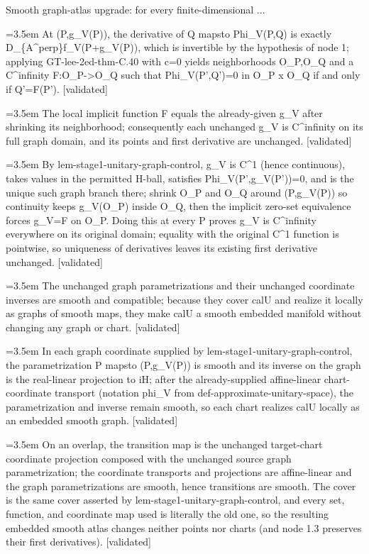 \documentclass{article}
\newcommand{\step}[1]{\par\noindent\hangindent=3.5em\hangafter=1%
  \makebox[3.5em][l]{\textbf{#1.}}}
\newcommand{\steptag}[1]{\hfill{\small\textsf{[#1]}}}
\begin{document}
\begin{proofbox}{Smooth graph-atlas upgrade: for every finite-dimensional ...}
\step{1.2.2} At (P,g\_V(P)), the derivative of Q mapsto Phi\_V(P,Q) is exactly D\_\{A\textasciicircum{}perp\}f\_V(P+g\_V(P)), which is invertible by the hypothesis of node 1; applying GT-lee-2ed-thm-C.40 with c=0 yields neighborhoods O\_P,O\_Q and a C\textasciicircum{}infinity F:O\_P->O\_Q such that Phi\_V(P',Q')=0 in O\_P x O\_Q if and only if Q'=F(P'). \steptag{validated} \\[4pt]
\step{1.3} The local implicit function F equals the already-given g\_V after shrinking its neighborhood; consequently each unchanged g\_V is C\textasciicircum{}infinity on its full graph domain, and its points and first derivative are unchanged. \steptag{validated} \\[6pt]
\step{1.3.1} By lem-stage1-unitary-graph-control, g\_V is C\textasciicircum{}1 (hence continuous), takes values in the permitted H-ball, satisfies Phi\_V(P',g\_V(P'))=0, and is the unique such graph branch there; shrink O\_P and O\_Q around (P,g\_V(P)) so continuity keeps g\_V(O\_P) inside O\_Q, then the implicit zero-set equivalence forces g\_V=F on O\_P. Doing this at every P proves g\_V is C\textasciicircum{}infinity everywhere on its original domain; equality with the original C\textasciicircum{}1 function is pointwise, so uniqueness of derivatives leaves its existing first derivative unchanged. \steptag{validated} \\[4pt]
\step{1.4} The unchanged graph parametrizations and their unchanged coordinate inverses are smooth and compatible; because they cover calU and realize it locally as graphs of smooth maps, they make calU a smooth embedded manifold without changing any graph or chart. \steptag{validated} \\[6pt]
\step{1.4.1} In each graph coordinate supplied by lem-stage1-unitary-graph-control, the parametrization P mapsto (P,g\_V(P)) is smooth and its inverse on the graph is the real-linear projection to iH; after the already-supplied affine-linear chart-coordinate transport (notation phi\_V from def-approximate-unitary-space), the parametrization and inverse remain smooth, so each chart realizes calU locally as an embedded smooth graph. \steptag{validated} \\[4pt]
\step{1.4.2} On an overlap, the transition map is the unchanged target-chart coordinate projection composed with the unchanged source graph parametrization; the coordinate transports and projections are affine-linear and the graph parametrizations are smooth, hence transitions are smooth. The cover is the same cover asserted by lem-stage1-unitary-graph-control, and every set, function, and coordinate map used is literally the old one, so the resulting embedded smooth atlas changes neither points nor charts (and node 1.3 preserves their first derivatives). \steptag{validated} \\[6pt]

\end{proofbox}
\end{document}
